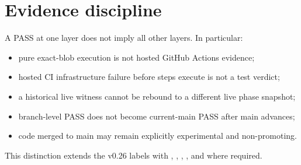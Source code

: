 \section{Evidence discipline}
A PASS at one layer does not imply all other layers. In particular:
\begin{itemize}
\item pure exact-blob execution is not hosted GitHub Actions evidence;
\item hosted CI infrastructure failure before steps execute is not a test verdict;
\item a historical live witness cannot be rebound to a different live phase snapshot;
\item branch-level PASS does not become current-main PASS after main advances;
\item code merged to main may remain explicitly experimental and non-promoting.
\end{itemize}

This distinction extends the v0.26 labels with , , , , and  where required.
